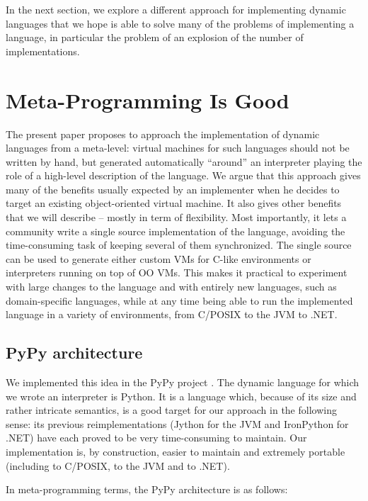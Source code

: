 \documentclass{llncs}
\begin{document}
In the next section, we explore a different approach for implementing
dynamic languages that we hope is able to solve many of the problems of
implementing a language, in particular the problem of an explosion of the number
of implementations.

\section{Meta-Programming Is Good}
\label{sect:metaprogramming}

The present paper proposes to approach the implementation of dynamic
languages from a meta-level: virtual machines for such languages should
not be written by hand, but generated automatically ``around'' an
interpreter playing the role of a high-level description of the language.  We
argue that this approach gives many of the benefits usually expected by
an implementer when he decides to target an existing object-oriented
virtual machine.  It also gives other benefits that we will describe --
mostly in term of flexibility.  Most importantly, it lets a
community write a single source implementation of the language, avoiding
the time-consuming task of keeping several of them synchronized.  The single
source can be used to generate either custom VMs for C-like
environments or interpreters running on top of OO VMs.  This makes it
practical to experiment with large changes to the language and with
entirely new languages, such as domain-specific languages, while at any
time being able to run the implemented language in a variety of
environments, from C/POSIX to the JVM to .NET.

\subsection{PyPy architecture}

We implemented this idea in the PyPy project \cite{pypy}.  The dynamic language
for which we wrote an interpreter is Python.  It is a language which,
because of its size and rather intricate semantics, is a good target for
our approach in the following sense: its previous reimplementations
(Jython for the JVM and IronPython for .NET) have each proved to be very
time-consuming to maintain.  Our implementation is, by construction,
easier to maintain and extremely portable (including to C/POSIX, to the
JVM and to .NET).

In meta-programming terms, the PyPy architecture is as follows:
\end{document}
